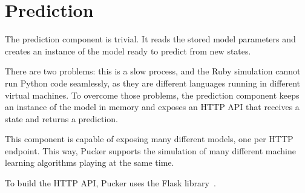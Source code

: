 \section{Prediction}
\label{sec:prediction}

The prediction component is trivial. It reads the stored model parameters and creates an instance of the model ready to predict from new states.

There are two problems: this is a slow process, and the Ruby simulation cannot run Python code seamlessly, as they are different languages running in different virtual machines. To overcome those problems, the prediction component keeps an instance of the model in memory and exposes an HTTP API that receives a state and returns a prediction.

This component is capable of exposing many different models, one per HTTP endpoint. This way, Pucker supports the simulation of many different machine learning algorithms playing at the same time.

To build the HTTP API, Pucker uses the Flask library~\cite{flask.pocoo.org}.

